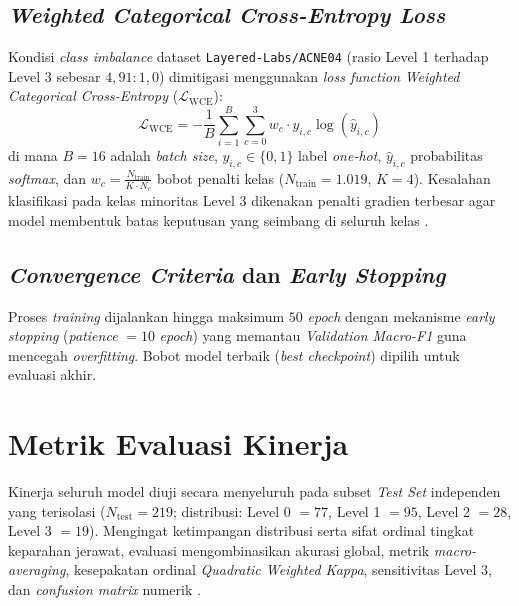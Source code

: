 \subsection{\textit{Weighted Categorical Cross-Entropy Loss}}
Kondisi \textit{class imbalance} dataset \texttt{Layered-Labs/ACNE04} (rasio Level 1 terhadap Level 3 sebesar $4,91 : 1,0$) dimitigasi menggunakan \textit{loss function} \textit{Weighted Categorical Cross-Entropy} ($\mathcal{L}_{\text{WCE}}$):
\begin{equation}
    \mathcal{L}_{\text{WCE}} = - \frac{1}{B} \sum_{i=1}^{B} \sum_{c=0}^{3} w_c \cdot y_{i,c} \log(\hat{y}_{i,c})
\end{equation}
di mana $B = 16$ adalah \textit{batch size}, $y_{i,c} \in \{0, 1\}$ label \textit{one-hot}, $\hat{y}_{i,c}$ probabilitas \textit{softmax}, dan $w_c = \frac{N_{\text{train}}}{K \cdot N_c}$ bobot penalti kelas ($N_{\text{train}} = 1.019$, $K = 4$). Kesalahan klasifikasi pada kelas minoritas Level 3 dikenakan penalti gradien terbesar agar model membentuk batas keputusan yang seimbang di seluruh kelas \cite{vut2025}.

\subsection{\textit{Convergence Criteria} dan \textit{Early Stopping}}
Proses \textit{training} dijalankan hingga maksimum $50$ \textit{epoch} dengan mekanisme \textit{early stopping} (\textit{patience} $= 10$ \textit{epoch}) yang memantau \textit{Validation Macro-F1} guna mencegah \textit{overfitting}. Bobot model terbaik (\textit{best checkpoint}) dipilih untuk evaluasi akhir.

\section{Metrik Evaluasi Kinerja}
\label{sec:metrik_evaluasi}

Kinerja seluruh model diuji secara menyeluruh pada subset \textit{Test Set} independen yang terisolasi ($N_{\text{test}} = 219$; distribusi: Level 0 $= 77$, Level 1 $= 95$, Level 2 $= 28$, Level 3 $= 19$). Mengingat ketimpangan distribusi serta sifat ordinal tingkat keparahan jerawat, evaluasi mengombinasikan akurasi global, metrik \textit{macro-averaging}, kesepakatan ordinal \textit{Quadratic Weighted Kappa}, sensitivitas Level 3, dan \textit{confusion matrix} numerik \cite{davila2024, vut2025}.

